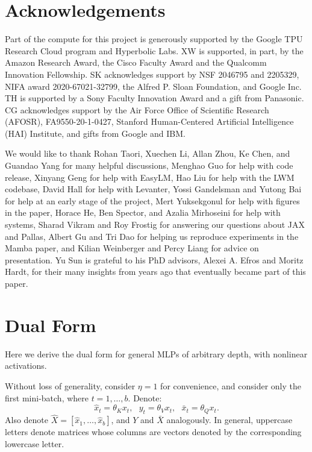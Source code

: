 \documentclass{article}
\begin{document}
\section*{Acknowledgements}
Part of the compute for this project is generously supported by the Google TPU Research Cloud program and Hyperbolic Labs.
XW is supported, in part, by the Amazon Research Award, the Cisco Faculty Award and the Qualcomm Innovation Fellowship.
SK acknowledges support by NSF 2046795 and 2205329, NIFA award 2020-67021-32799, the Alfred P. Sloan Foundation, and Google Inc.
TH is supported by a Sony Faculty Innovation Award and a gift from Panasonic.
CG acknowledges support by the Air Force Office of Scientific Research (AFOSR), FA9550-20-1-0427, Stanford Human-Centered Artificial Intelligence (HAI) Institute, and gifts from Google and IBM.

We would like to thank Rohan Taori, Xuechen Li, Allan Zhou, Ke Chen, and Guandao Yang for many helpful discussions,
Menghao Guo for help with code release,
Xinyang Geng for help with EasyLM,
Hao Liu for help with the LWM codebase,
David Hall for help with Levanter,
Yossi Gandelsman and Yutong Bai for help at an early stage of the project,
Mert Yuksekgonul for help with figures in the paper,
Horace He, Ben Spector, and Azalia Mirhoseini for help with systems,
Sharad Vikram and Roy Frostig for answering our questions about JAX and Pallas, 
Albert Gu and Tri Dao for helping us reproduce experiments in the Mamba paper,
and Kilian Weinberger and Percy Liang for advice on presentation.
Yu Sun is grateful to his PhD advisors,
Alexei A. Efros and Moritz Hardt, for their many insights from years ago that eventually became part of this paper.

\clearpage




\clearpage
\appendix

\section{Dual Form}
\label{app:dual}

Here we derive the dual form for general MLPs of arbitrary depth, with nonlinear activations.

Without loss of generality, consider $\eta = 1$ for convenience, and consider only the first mini-batch, where $t=1,\dots,b$.
Denote:
\vspace{-1ex}
$$
\hat{x}_t = \theta_Kx_t, ~~~
y_t = \theta_Vx_t, ~~~
\bar{x}_t = \theta_Qx_t.
$$
Also denote
$\hat{X} = [\hat{x}_1, \dots, \hat{x}_b]$,
and $Y$ and $\bar{X}$ analogously.
In general, uppercase letters denote matrices whose columns are vectors denoted by the corresponding lowercase letter.
\end{document}
